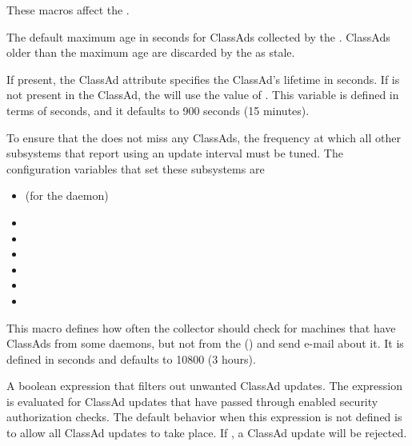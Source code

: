 These macros affect the .
\begin{description}
  
\label{param:ClassadLifetime}
\item[\Macro{CLASSAD\_LIFETIME}]
  The default maximum age in seconds for ClassAds collected by the
  .  ClassAds older than the maximum age are
  discarded by the  as stale.

  If present, the ClassAd attribute  specifies the
  ClassAd's lifetime in seconds.  
  If  is not present in the ClassAd, 
  the  will use the value of
  .  
  This variable is defined in terms of seconds, 
  and it defaults to 900 seconds (15 minutes).
  
  To ensure that the  does not miss any ClassAds, the
  frequency at which all other subsystems that report using an
  update interval must be tuned.
  The configuration variables that set these subsystems are
  \begin{itemize}
  \item {} (for the  daemon)
  \item {}
  \item {}
  \item {}
  \item {}
  \item {}
  \item {}
  \end{itemize}

\label{param:MasterCheckInterval}
\item[\Macro{MASTER\_CHECK\_INTERVAL}]
  This macro defines how often the
  collector should check for machines that have ClassAds from some
  daemons, but not from the  ()
  and send e-mail about it.  It is defined in seconds and 
  defaults to 10800 (3 hours).

\label{param:CollectorRequirements}
\item[\Macro{COLLECTOR\_REQUIREMENTS}]
  A boolean expression that filters out unwanted ClassAd updates.  The
  expression is evaluated for ClassAd updates that have 
  passed through enabled security authorization checks.
  The default behavior when this expression is not
  defined is to allow all ClassAd updates to take place.
  If , a ClassAd update will be rejected.


\end{description}
